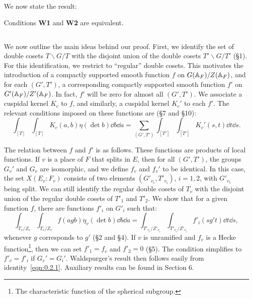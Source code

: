 We now state the result:
\begin{theorem}[Waldspurger] Conditions \textbf{W1} and \textbf{W2} are equivalent. \end{theorem}

\subsection{}
We now outline the main ideas behind our proof.
First, we identify the set of double cosets $T \backslash G / T$ with the disjoint union of the double cosets $T' \backslash G / T'$ (\S 1).
For this identification, we restrict to ``regular'' double cosets.
This motivates the introduction of a compactly supported smooth function $f$ on $G(\mathbb{A}_F) / Z(\mathbb{A}_F)$, and for each $(G', T')$, a corresponding compactly supported smooth function $f'$ on $G'(\mathbb{A}_F) / Z'(\mathbb{A}_F)$.
In fact, $f'$ will be zero for almost all $(G', T')$.
We associate a cuspidal kernel $K_c$ to $f$, and similarly, a cuspidal kernel $K_c'$ to each $f'$.
The relevant conditions imposed on these functions are (\S 7 and \S 10):
\begin{equation}
    \label{eqn:0.2.1}
    \int_{[T]} \int_{[T]} K_{c}(a, b) \eta(\det b) \dd b \dd a = \sum_{(G', T')} \int_{[T']} \int_{[T']} K_{c}'(s, t) \dd t \dd s.
\end{equation}

The relation between $f$ and $f'$ is as follows.
These functions are products of local functions.
If $v$ is a place of $F$ that splits in $E$, then for all $(G', T')$, the groups $G_v'$ and $G_v$ are isomorphic, and we define $f_v$ and $f_v'$ to be identical.
In this case, the set $X(E_v: F_v)$ consists of two elements $(G'_{v_i}, T'_{v_i})$, $i = 1, 2$, with $G'_{v_1}$ being split.
We can still identify the regular double cosets of $T_v$ with the disjoint union of the regular double cosets of $T'_1$ and $T'_2$.
We show that for a given function $f$, there are functions $f'_i$ on $G'_i$ such that:
\begin{equation*}
    \int_{T_v / Z_v} \int_{T_v / Z_v} f(agb) \eta_v(\det b) \dd b \dd a = \int_{T'_{v_i} / Z'_{v_i}} \int_{T'_{v_i} / Z'_{v_i}} f'_{i}(sg't) \dd t \dd s,
\end{equation*}
whenever $g$ corresponds to $g'$ (\S 2 and \S 4). If $v$ is unramified and $f_v$ is a Hecke function\footnote{The characteristic function of the spherical subgroup.}, then we can set $f'_1 = f_v$ and $f'_2 = 0$ (\S 5). The condition simplifies to $f'_v = f'_i$ if $G_v' = G_i'$. Waldspurger's result then follows easily from identity~\eqref{eqn:0.2.1}. Auxiliary results can be found in Section 6.

